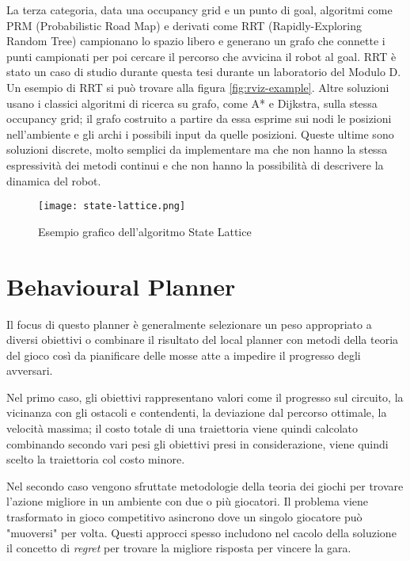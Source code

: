 La terza categoria, data una occupancy grid e un punto di goal, algoritmi come PRM (Probabilistic Road
Map) e derivati come RRT (Rapidly-Exploring Random Tree) campionano lo spazio libero e generano un grafo
che connette i punti campionati per poi cercare il percorso che avvicina il robot al goal. RRT è stato un
caso di studio durante questa tesi durante un laboratorio del Modulo D. Un esempio di RRT si può trovare
alla figura \ref{fig:rviz-example}. Altre soluzioni usano i classici algoritmi di ricerca su grafo, come
A* e Dijkstra, sulla stessa occupancy grid; il grafo costruito a partire da essa esprime sui nodi le posizioni
nell'ambiente e gli archi i possibili input da quelle posizioni. Queste ultime sono soluzioni discrete,
molto semplici da implementare ma che non hanno la stessa espressività dei metodi continui e che non
hanno la possibilità di descrivere la dinamica del robot.

\begin{figure}[h]
	\begin{center}
		\texttt{[image: state-lattice.png]}
	\end{center}
	\caption{Esempio grafico dell'algoritmo State Lattice}\label{fig:state-lattice}
\end{figure}

\section{Behavioural Planner}
Il focus di questo planner è generalmente selezionare un peso appropriato a diversi obiettivi o combinare
il risultato del local planner con metodi della teoria del gioco così da pianificare delle mosse atte a
impedire il progresso degli avversari.

Nel primo caso, gli obiettivi rappresentano valori come il progresso sul circuito, la vicinanza con gli
ostacoli e contendenti, la deviazione dal percorso ottimale, la velocità massima; il costo totale di una
traiettoria viene quindi calcolato combinando secondo vari pesi gli obiettivi presi in considerazione,
viene quindi scelto la traiettoria col costo minore.

Nel secondo caso vengono sfruttate metodologie della teoria dei giochi per trovare l'azione migliore in
un ambiente con due o più giocatori. Il problema viene trasformato in gioco competitivo asincrono dove un
singolo giocatore può "muoversi" per volta. Questi approcci spesso includono nel cacolo della soluzione il
concetto di \textit{regret} per trovare la migliore risposta per vincere la gara.

